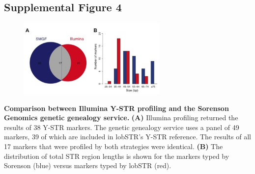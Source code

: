 \pagebreak
\subsection{Supplemental Figure 4}
\begin{figure}[h!]
\centering
\label{fig:sursup4}
\includegraphics[width=0.65\textwidth]{Figures/App1/SuppFig4.jpg}
\end{figure}
\textbf{Comparison between Illumina Y-STR profiling and the Sorenson Genomics genetic genealogy service.} \textbf{(A)} Illumina profiling returned the results of 38 Y-STR markers. The genetic genealogy service uses a panel of 49 markers, 39 of which are included in lobSTR's Y-STR reference. The results of all 17 markers that were profiled by both strategies were identical. \textbf{(B)} The distribution of total STR region lengths is shown for the markers typed by Sorenson (blue) versus markers typed by lobSTR (red).

\pagebreak
